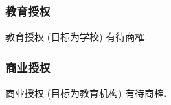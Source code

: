 \documentclass{ctexart}
\begin{document}
\subsubsection{教育授权}
教育授权 (目标为学校) 有待商榷.

\subsubsection{商业授权}
商业授权 (目标为教育机构) 有待商榷.



\end{document}
